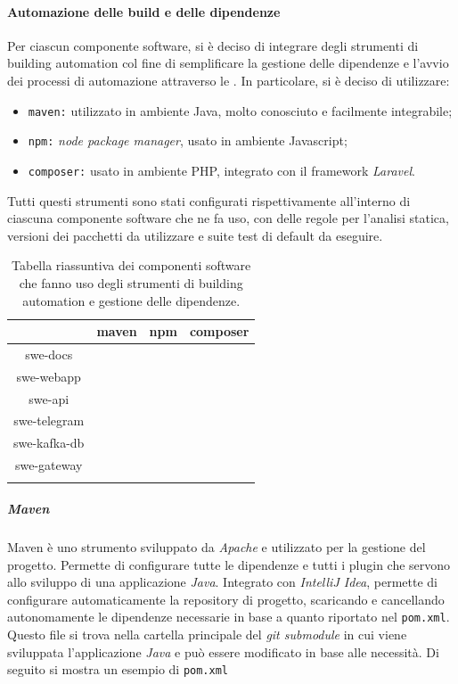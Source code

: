 	\paragraph{Automazione delle build e delle dipendenze}

	Per ciascun componente software, si è deciso di integrare degli strumenti di building automation col fine di semplificare la gestione delle dipendenze e l'avvio dei processi di automazione attraverso le .
	In particolare, si è deciso di utilizzare:
	\begin{itemize}
		\item \verb!maven:! utilizzato in ambiente Java, molto conosciuto e facilmente integrabile;
		\item \verb!npm:! \textit{node package manager}, usato in ambiente Javascript;
		\item \verb!composer:! usato in ambiente PHP, integrato con il framework \textit{Laravel}.
	\end{itemize}

	Tutti questi strumenti sono stati configurati rispettivamente all'interno di ciascuna componente software che ne fa uso, con delle regole per l'analisi statica, versioni dei pacchetti da utilizzare e suite test di default da eseguire.	

\begin{center}
	\begin{longtable}{|c|c|c|c|}
	\hline
	\rowcolor{lighter-grayer}
	 & \textbf{maven} & \textbf{npm} & \textbf{composer} \\
	\hline
	\endfirsthead
	swe-docs & & &  \\ \hline
	swe-webapp & & \checkmark & \checkmark  \\ \hline
	swe-api & \checkmark & &  \\ \hline
	swe-telegram & & \checkmark &  \\ \hline
	swe-kafka-db & \checkmark & &  \\ \hline
	swe-gateway & \checkmark & &  \\
	\hline
	\caption{Tabella riassuntiva dei componenti software che fanno uso degli strumenti di building automation e gestione delle dipendenze.}
	\end{longtable}
\end{center}

		\subparagraph{Maven} 	

		Maven è uno strumento sviluppato da \textit{Apache} e utilizzato per la gestione del progetto. Permette di configurare tutte le dipendenze e tutti i plugin che servono allo sviluppo di una applicazione \textit{Java}. Integrato con \textit{IntelliJ Idea}, permette di configurare automaticamente la repository di progetto, scaricando e cancellando autonomamente le dipendenze necessarie in base a quanto riportato nel \verb!pom.xml!. Questo file si trova nella cartella principale del \textit{git submodule} in cui viene sviluppata l'applicazione \textit{Java} e può essere modificato in base alle necessità. Di seguito si mostra un esempio di \verb!pom.xml!

